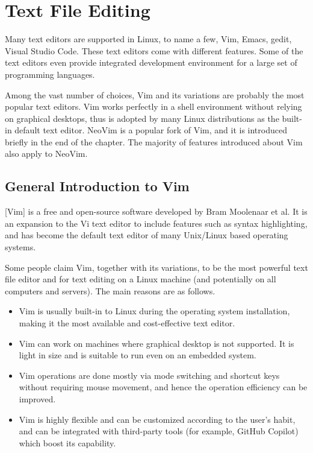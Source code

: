 \chapter{Text File Editing} \label{ch:tfe}

Many text editors are supported in Linux, to name a few, Vim, Emacs, gedit, Visual Studio Code. These text editors come with different features. Some of the text editors even provide integrated development environment for a large set of programming languages.

Among the vast number of choices, Vim and its variations are probably the most popular text editors. Vim works perfectly in a shell environment without relying on graphical desktops, thus is adopted by many Linux distributions as the built-in default text editor. NeoVim is a popular fork of Vim, and it is introduced briefly in the end of the chapter. The majority of features introduced about Vim also apply to NeoVim.

\section{General Introduction to Vim} \label{sec:vimintro}

[Vim] is a free and open-source software developed by Bram Moolenaar et al. It is an expansion to the Vi text editor to include features such as syntax highlighting, and has become the default text editor of many Unix/Linux based operating systems.

Some people claim Vim, together with its variations, to be the most powerful text file editor and  for text editing on a Linux machine (and potentially on all computers and servers). The main reasons are as follows.
\begin{itemize}
  \item Vim is usually built-in to Linux during the operating system installation, making it the most available and cost-effective text editor.
  \item Vim can work on machines where graphical desktop is not supported. It is light in size and is suitable to run even on an embedded system.
  \item Vim operations are done mostly via mode switching and shortcut keys without requiring mouse movement, and hence the operation efficiency can be improved.
  \item Vim is highly flexible and can be customized according to the user's habit, and can be integrated with third-party tools (for example, GitHub Copilot) which boost its capability.
\end{itemize}

